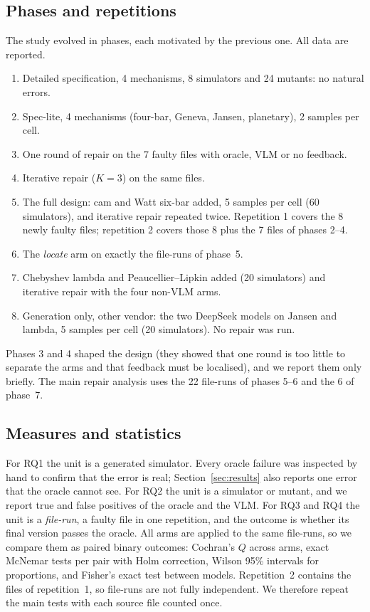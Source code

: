 \subsection{Phases and repetitions}
The study evolved in phases, each motivated by the previous one. All data are reported.
\begin{enumerate}
\item Detailed specification, 4 mechanisms, 8 simulators and 24 mutants: no natural errors.
\item Spec-lite, 4 mechanisms (four-bar, Geneva, Jansen, planetary), 2 samples per cell.
\item One round of repair on the 7 faulty files with oracle, VLM or no feedback.
\item Iterative repair ($K=3$) on the same files.
\item The full design: cam and Watt six-bar added, 5 samples per cell (60 simulators), and iterative repair repeated twice. Repetition 1 covers the 8 newly faulty files; repetition 2 covers those 8 plus the 7 files of phases 2--4.
\item The \emph{locate} arm on exactly the file-runs of phase~5.
\item Chebyshev lambda and Peaucellier--Lipkin added (20 simulators) and iterative repair with the four non-VLM arms.
\item Generation only, other vendor: the two DeepSeek models on Jansen and lambda, 5 samples per cell (20 simulators). No repair was run.
\end{enumerate}
Phases 3 and 4 shaped the design (they showed that one round is too little to separate the arms and that feedback must be localised), and we report them only briefly. The main repair analysis uses the 22 file-runs of phases 5--6 and the 6 of phase~7.

\subsection{Measures and statistics}
For RQ1 the unit is a generated simulator. Every oracle failure was inspected by hand to confirm that the error is real; Section~\ref{sec:results} also reports one error that the oracle cannot see. For RQ2 the unit is a simulator or mutant, and we report true and false positives of the oracle and the VLM. For RQ3 and RQ4 the unit is a \emph{file-run}, a faulty file in one repetition, and the outcome is whether its final version passes the oracle. All arms are applied to the same file-runs, so we compare them as paired binary outcomes: Cochran's $Q$ across arms, exact McNemar tests per pair with Holm correction, Wilson 95\% intervals for proportions, and Fisher's exact test between models. Repetition~2 contains the files of repetition~1, so file-runs are not fully independent. We therefore repeat the main tests with each source file counted once.

